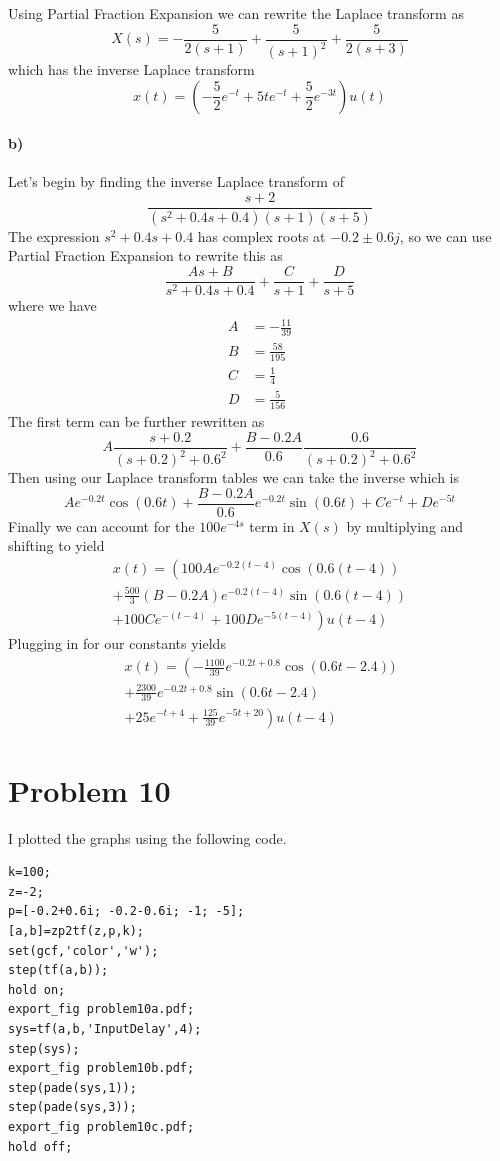 \documentclass[12pt]{article}
\begin{document}
Using Partial Fraction Expansion we can rewrite the Laplace transform as
\[X(s)=-\frac{5}{2(s+1)} + \frac{5}{(s+1)^2} + \frac{5}{2(s+3)}\]
which has the inverse Laplace transform
\[x(t)=\left(-\frac{5}{2}e^{-t} + 5te^{-t} + \frac{5}{2}e^{-3t}\right)u(t)\]

\paragraph{b)}

Let's begin by finding the inverse Laplace transform of
\[\frac{s+2}{(s^2+0.4s+0.4)(s+1)(s+5)}\]
The expression \(s^2+0.4s+0.4\) has complex roots at \(-0.2\pm 0.6j\), so we can use Partial Fraction Expansion to rewrite this as
\[\frac{As+B}{s^2+0.4s+0.4}+\frac{C}{s+1}+\frac{D}{s+5}\]
where we have
\begin{align*}
    A&=-\frac{11}{39}\\
    B&=\frac{58}{195}\\
    C&=\frac{1}{4}\\
    D&=\frac{5}{156}
\end{align*}
The first term can be further rewritten as
\[A\frac{s+0.2}{(s+0.2)^2+0.6^2} + \frac{B-0.2A}{0.6}\frac{0.6}{(s+0.2)^2+0.6^2}\]
Then using our Laplace transform tables we can take the inverse which is
\[Ae^{-0.2t}\cos(0.6t)+\frac{B-0.2A}{0.6}e^{-0.2t}\sin(0.6t)+Ce^{-t}+De^{-5t}\]
Finally we can account for the \(100e^{-4s}\) term in \(X(s)\) by multiplying and shifting to yield
\begin{multline*}
    x(t)=\left(100Ae^{-0.2(t-4)}\cos(0.6(t-4))\right.\\
    +\frac{500}{3}(B-0.2A)e^{-0.2(t-4)}\sin(0.6(t-4))\\
    \left.+100Ce^{-(t-4)}+100De^{-5(t-4)}\right)u(t-4)
\end{multline*}
Plugging in for our constants yields
\begin{multline*}
    x(t)=\left(-\frac{1100}{39}e^{-0.2t+0.8}\cos(0.6t-2.4))\right.\\
    +\frac{2300}{39}e^{-0.2t+0.8}\sin(0.6t-2.4)\\
    \left.+25e^{-t+4}+\frac{125}{39}e^{-5t+20}\right)u(t-4)
\end{multline*}

\section*{Problem 10}

I plotted the graphs using the following code.
\begin{verbatim}
k=100;
z=-2;
p=[-0.2+0.6i; -0.2-0.6i; -1; -5];
[a,b]=zp2tf(z,p,k);
set(gcf,'color','w');
step(tf(a,b));
hold on;
export_fig problem10a.pdf;
sys=tf(a,b,'InputDelay',4);
step(sys);
export_fig problem10b.pdf;
step(pade(sys,1));
step(pade(sys,3));
export_fig problem10c.pdf;
hold off;
\end{verbatim}
\end{document}
